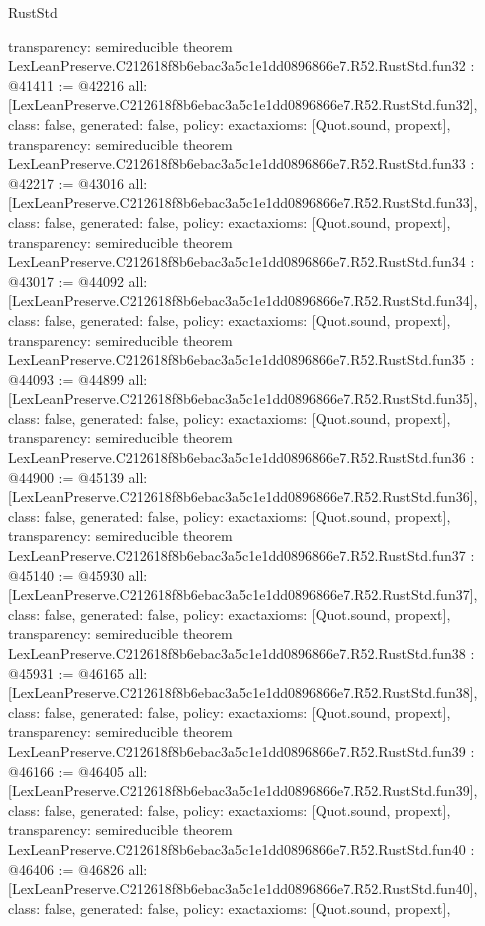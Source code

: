 \begin{lexlean}{RustStd}
\begin{coremodule}
{  transparency: semireducible
}
theorem LexLeanPreserve.C212618f8b6ebac3a5c1e1dd0896866e7.R52.RustStd.fun32 : @41411 := @42216 {
  all: [LexLeanPreserve.C212618f8b6ebac3a5c1e1dd0896866e7.R52.RustStd.fun32],
  class: false,
  generated: false,
  policy: exact{axioms: [Quot.sound, propext]},
  transparency: semireducible
}
theorem LexLeanPreserve.C212618f8b6ebac3a5c1e1dd0896866e7.R52.RustStd.fun33 : @42217 := @43016 {
  all: [LexLeanPreserve.C212618f8b6ebac3a5c1e1dd0896866e7.R52.RustStd.fun33],
  class: false,
  generated: false,
  policy: exact{axioms: [Quot.sound, propext]},
  transparency: semireducible
}
theorem LexLeanPreserve.C212618f8b6ebac3a5c1e1dd0896866e7.R52.RustStd.fun34 : @43017 := @44092 {
  all: [LexLeanPreserve.C212618f8b6ebac3a5c1e1dd0896866e7.R52.RustStd.fun34],
  class: false,
  generated: false,
  policy: exact{axioms: [Quot.sound, propext]},
  transparency: semireducible
}
theorem LexLeanPreserve.C212618f8b6ebac3a5c1e1dd0896866e7.R52.RustStd.fun35 : @44093 := @44899 {
  all: [LexLeanPreserve.C212618f8b6ebac3a5c1e1dd0896866e7.R52.RustStd.fun35],
  class: false,
  generated: false,
  policy: exact{axioms: [Quot.sound, propext]},
  transparency: semireducible
}
theorem LexLeanPreserve.C212618f8b6ebac3a5c1e1dd0896866e7.R52.RustStd.fun36 : @44900 := @45139 {
  all: [LexLeanPreserve.C212618f8b6ebac3a5c1e1dd0896866e7.R52.RustStd.fun36],
  class: false,
  generated: false,
  policy: exact{axioms: [Quot.sound, propext]},
  transparency: semireducible
}
theorem LexLeanPreserve.C212618f8b6ebac3a5c1e1dd0896866e7.R52.RustStd.fun37 : @45140 := @45930 {
  all: [LexLeanPreserve.C212618f8b6ebac3a5c1e1dd0896866e7.R52.RustStd.fun37],
  class: false,
  generated: false,
  policy: exact{axioms: [Quot.sound, propext]},
  transparency: semireducible
}
theorem LexLeanPreserve.C212618f8b6ebac3a5c1e1dd0896866e7.R52.RustStd.fun38 : @45931 := @46165 {
  all: [LexLeanPreserve.C212618f8b6ebac3a5c1e1dd0896866e7.R52.RustStd.fun38],
  class: false,
  generated: false,
  policy: exact{axioms: [Quot.sound, propext]},
  transparency: semireducible
}
theorem LexLeanPreserve.C212618f8b6ebac3a5c1e1dd0896866e7.R52.RustStd.fun39 : @46166 := @46405 {
  all: [LexLeanPreserve.C212618f8b6ebac3a5c1e1dd0896866e7.R52.RustStd.fun39],
  class: false,
  generated: false,
  policy: exact{axioms: [Quot.sound, propext]},
  transparency: semireducible
}
theorem LexLeanPreserve.C212618f8b6ebac3a5c1e1dd0896866e7.R52.RustStd.fun40 : @46406 := @46826 {
  all: [LexLeanPreserve.C212618f8b6ebac3a5c1e1dd0896866e7.R52.RustStd.fun40],
  class: false,
  generated: false,
  policy: exact{axioms: [Quot.sound, propext]},
}
\end{coremodule}
\end{lexlean}
